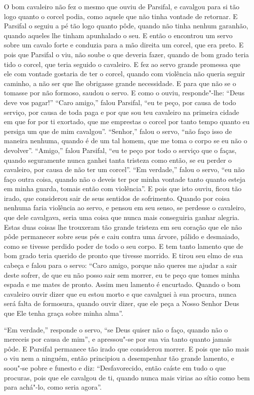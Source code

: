 O bom cavaleiro não fez o mesmo que ouviu de Parsifal, e cavalgou para si
tão logo quanto o corcel podia, como aquele que não tinha vontade de retornar.
E Parsifal o seguiu a pé tão logo quanto pôde, quando não tinha nenhum
garanhão, quando aqueles lhe tinham apunhalado o seu. E então o encontrou um
servo sobre um cavalo forte e conduzia para a mão direita um corcel, que era
preto. E pois que Parsifal o viu, não soube o que deveria fazer, quando de bom
grado teria tido o corcel, que teria seguido o cavaleiro. E fez ao servo grande
promessa que ele com vontade gostaria de ter o corcel, quando com violência não
queria seguir caminho, a não ser que lhe obrigasse grande necessidade. E para
que não se o tomasse por não formoso, saudou o servo. E como o ouviu,
responde"-lhe: “Deus deve vos pagar!” “Caro amigo,” falou Parsifal, “eu te
peço, por causa de todo serviço, por causa de toda paga e por que sou teu
cavaleiro na primeira cidade em que for por ti exortado, que me emprestas o
corcel por tanto tempo quanto eu persiga um que de mim cavalgou”.
“Senhor,” falou o servo, “não faço isso de maneira nenhuma, quando é de um tal
homem, que me toma o corpo se eu não o devolver”. “Amigo,” falou Parsifal, “eu
te peço por todo o serviço que o faças, quando seguramente nunca ganhei tanta
tristeza como então, se eu perder o cavaleiro, por causa de não ter um corcel”.
“Em verdade,” falou o servo, “eu não faço outra coisa, quando não o deveis ter
por minha vontade tanto quanto esteja em minha guarda, tomais então com
violência”. E pois que isto ouviu, ficou tão irado, que considerou sair de seus
sentidos de sofrimento. Quando por coisa nenhuma faria violência ao servo, e
pensou em seu senso, se perdesse o cavaleiro, que dele cavalgava, seria uma
coisa que nunca mais conseguiria ganhar alegria. Estas duas coisas lhe
trouxeram tão grande tristeza em seu coração que ele não pôde permanecer sobre
seus pés e caiu contra uma árvore, pálido e desmaiado, como se tivesse perdido
poder de todo o seu corpo. E tem tanto lamento que de bom grado teria querido
de pronto que tivesse morrido. E tirou seu elmo de sua cabeça e falou para o
servo: “Caro amigo, porque não queres me ajudar a sair deste sofrer, de que eu
não posso sair sem morrer, eu te peço que tomes minha espada e me mates de
pronto. Assim meu lamento é encurtado. Quando o bom cavaleiro ouvir dizer que
eu estou morto e que cavalguei à sua procura, nunca será falta de formosura,
quando ouvir dizer, que ele peça a Nosso Senhor Deus que Ele tenha graça sobre
minha alma”. 

“Em verdade,” responde o servo, “se Deus quiser não o faço, quando não o
mereceis por causa de mim”, e apressou"-se por sua via tanto quanto jamais pôde.
E Parsifal permanece tão irado que considerou morrer. E pois que não mais o
viu nem a ninguém, então principiou a desempenhar tão grande lamento, e soou"-se
pobre e funesto e diz: “Desfavorecido, então caíste em tudo o que procuras,
pois que ele cavalgou de ti, quando nunca mais virias ao sítio como bem para
achá"-lo, como seria agora”. 

